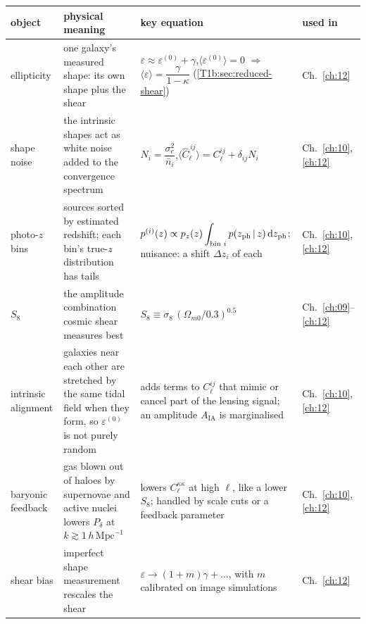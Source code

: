 \begin{center}
\small
\renewcommand{\arraystretch}{1.3}
\begin{tabularx}{\linewidth}{@{}>{\raggedright\arraybackslash}p{2.0cm}
                               >{\raggedright\arraybackslash}X
                               >{\raggedright\arraybackslash}p{6.8cm}
                               >{\raggedright\arraybackslash}p{1.35cm}@{}}
\toprule
object & physical meaning & key equation & used in\\\midrule
ellipticity & one galaxy's measured shape: its own shape plus the shear &
$\varepsilon\approx\varepsilon^{(0)}+\gamma$,\quad $\langle\varepsilon^{(0)}\rangle=0$ $\Rightarrow$ $\langle\varepsilon\rangle=\dfrac{\gamma}{1-\kappa}$ (\cref{T1b:sec:reduced-shear}) &
Ch.~\ref{ch:12}\\
shape noise & the intrinsic shapes act as white noise added to the convergence spectrum &
$N_i=\dfrac{\sigma_e^2}{\bar n_i}$,\quad $\langle\widehat C_\ell^{\,ij}\rangle=C_\ell^{ij}+\delta_{ij}N_i$ &
Ch.~\ref{ch:10}, \ref{ch:12}\\
photo-$z$ bins & sources sorted by estimated redshift; each bin's true-$z$ distribution has tails &
$p^{(i)}(z)\propto p_z(z)\displaystyle\int_{\text{bin }i}p(z_{\mathrm{ph}}\,\vert\, z)\,\mathrm{d} z_{\mathrm{ph}}$; nuisance: a shift $\Delta z_i$ of each &
Ch.~\ref{ch:10}, \ref{ch:12}\\
$S_8$ & the amplitude combination cosmic shear measures best &
$S_8\equiv\sigma_8\,(\Omega_{m0}/0.3)^{0.5}$ &
Ch.~\ref{ch:09}--\ref{ch:12}\\
intrinsic alignment & galaxies near each other are stretched by the same tidal field when they form, so $\varepsilon^{(0)}$ is not purely random &
adds terms to $C_\ell^{ij}$ that mimic or cancel part of the lensing signal; an amplitude $A_{\mathrm{IA}}$ is marginalised &
Ch.~\ref{ch:10}, \ref{ch:12}\\
baryonic feedback & gas blown out of haloes by supernovae and active nuclei lowers $P_\delta$ at $k\gtrsim1\,h\,\mathrm{Mpc}^{-1}$ &
lowers $C_\ell^{\kappa\kappa}$ at high $\ell$, like a lower $S_8$; handled by scale cuts or a feedback parameter &
Ch.~\ref{ch:10}, \ref{ch:12}\\
shear bias & imperfect shape measurement rescales the shear &
$\varepsilon\to(1+m)\gamma+\dots$, with $m$ calibrated on image simulations &
Ch.~\ref{ch:12}\\
\bottomrule
\end{tabularx}
\end{center}

